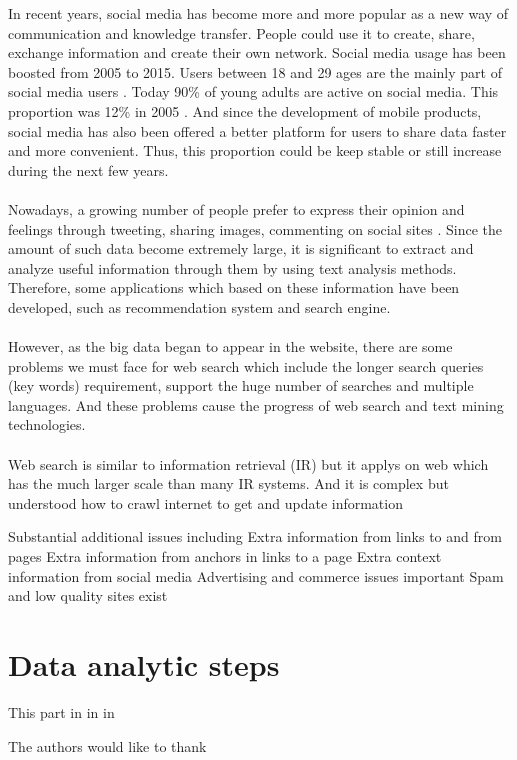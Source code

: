 \documentclass[sigconf]{acmart}
\begin{document}
In recent years, social media has become more and more popular as a new way of communication and knowledge transfer. People could use it to create, share, exchange information and create their own network. Social media usage has been boosted from 2005 to 2015. Users between 18 and 29 ages are the mainly part of social media users \cite{editor01}. Today 90\% of young adults are active on social media. This proportion was 12\% in 2005 \cite{editor02}. And since the development of mobile products, social media has also been offered a better platform for users to share data faster and more convenient. Thus, this proportion could be keep stable or still increase during the next few years. \\ \\
Nowadays, a growing number of people prefer to express their opinion and feelings through tweeting, sharing images, commenting on social sites \cite{editor01}. Since the amount of such data become extremely large, it is significant to extract and analyze useful information through them by using text analysis methods. Therefore, some applications which based on these information have been developed, such as recommendation system and search engine. \\ \\
However, as the big data began to appear in the website, there are some problems we must face for web search which include the longer search queries (key words) requirement, support the huge number of searches and multiple languages. And these problems cause the progress of web search and text mining technologies. \\ \\
Web search is similar to information retrieval (IR) but it applys on web which has the much larger scale than many IR systems. And it is complex but understood how to crawl internet to get and update information


Substantial additional issues including
Extra information from links to and from pages
Extra information from anchors in links to a page
Extra context information from social media
Advertising and commerce issues important
Spam and low quality sites exist

\section{Data analytic steps}
This part in in in 


\begin{acks}

  The authors would like to thank 

\end{acks}


 
\end{document}
